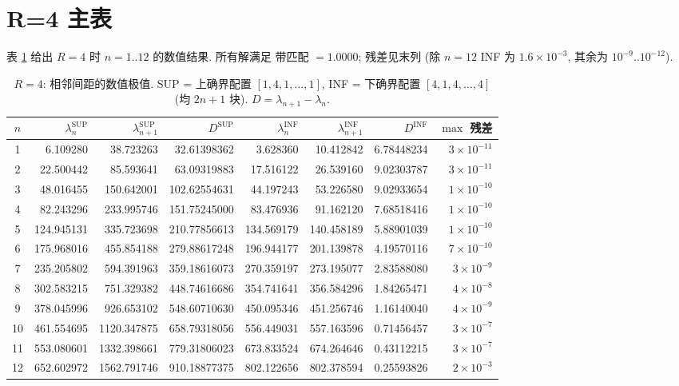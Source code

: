 \documentclass[UTF8]{ctexart}
\begin{document}
\section{R=4 主表}\label{sec:r4}

表 \ref{tab:r4} 给出 $R = 4$ 时 $n = 1..12$ 的数值结果. 所有解满足
带匹配 $= 1.0000$; 残差见末列 (除 $n=12$ INF 为 $1.6\times10^{-3}$,
其余为 $10^{-9}..10^{-12}$).

\begin{table}[ht]
\centering
\caption{$R=4$: 相邻间距的数值极值. SUP = 上确界配置 $[1,4,1,\dots,1]$,
INF = 下确界配置 $[4,1,4,\dots,4]$ (均 $2n+1$ 块). $D = \lambda_{n+1}-\lambda_n$.}
\label{tab:r4}
\small
\begin{tabular}{c|rrr|rrr|r}
	$n$ & $\lambda_n^{\mathrm{SUP}}$ & $\lambda_{n+1}^{\mathrm{SUP}}$ & $D^{\mathrm{SUP}}$ &
	$\lambda_n^{\mathrm{INF}}$ & $\lambda_{n+1}^{\mathrm{INF}}$ & $D^{\mathrm{INF}}$ &
	$\max$ 残差 \\\hline
	1 & 6.109280 & 38.723263 & 32.61398362 & 3.628360 & 10.412842 & 6.78448234 & $3\times10^{-11}$\\
	2 & 22.500442 & 85.593641 & 63.09319883 & 17.516122 & 26.539160 & 9.02303787 & $3\times10^{-11}$\\
	3 & 48.016455 & 150.642001 & 102.62554631 & 44.197243 & 53.226580 & 9.02933654 & $1\times10^{-10}$\\
	4 & 82.243296 & 233.995746 & 151.75245000 & 83.476936 & 91.162120 & 7.68518416 & $1\times10^{-10}$\\
	5 & 124.945131 & 335.723698 & 210.77856613 & 134.569179 & 140.458189 & 5.88901039 & $1\times10^{-10}$\\
	6 & 175.968016 & 455.854188 & 279.88617248 & 196.944177 & 201.139878 & 4.19570116 & $7\times10^{-10}$\\
	7 & 235.205802 & 594.391963 & 359.18616073 & 270.359197 & 273.195077 & 2.83588080 & $3\times10^{-9}$\\
	8 & 302.583215 & 751.329382 & 448.74616686 & 354.741641 & 356.584296 & 1.84265471 & $4\times10^{-8}$\\
	9 & 378.045996 & 926.653102 & 548.60710630 & 450.095346 & 451.256746 & 1.16140040 & $4\times10^{-9}$\\
	10 & 461.554695 & 1120.347875 & 658.79318056 & 556.449031 & 557.163596 & 0.71456457 & $3\times10^{-7}$\\
	11 & 553.080601 & 1332.398661 & 779.31806023 & 673.833524 & 674.264646 & 0.43112215 & $3\times10^{-7}$\\
	12 & 652.602972 & 1562.791746 & 910.18877375 & 802.122656 & 802.378594 & 0.25593826 & $2\times10^{-3}$\\
\end{tabular}
\end{table}
\end{document}
